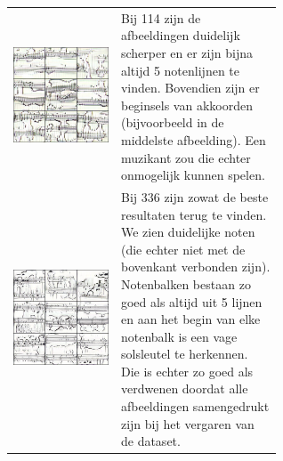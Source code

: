 \documentclass[dutch, twoside, a4paper, 10pt]{article}
\begin{document}
\begin{table}[H]
\begin{tabular}{c p{0.6\linewidth}}
          \includegraphics[scale=0.18]{114.jpg}  & \vspace{-10\baselineskip} Bij 114 zijn de afbeeldingen duidelijk scherper en er zijn bijna altijd 5 notenlijnen te vinden. Bovendien zijn er beginsels van akkoorden (bijvoorbeeld in de middelste afbeelding). Een muzikant zou die echter onmogelijk kunnen spelen.\\
          \includegraphics[scale=0.18]{336.jpg}  & \vspace{-10\baselineskip} Bij 336 zijn zowat de beste resultaten terug te vinden. We zien duidelijke noten (die echter niet met de bovenkant verbonden zijn). Notenbalken bestaan zo goed als altijd uit 5 lijnen en aan het begin van elke notenbalk is een vage solsleutel te herkennen. Die is echter zo goed als verdwenen doordat alle afbeeldingen samengedrukt zijn bij het vergaren van de dataset.

\end{tabular}
\end{table}
\end{document}
